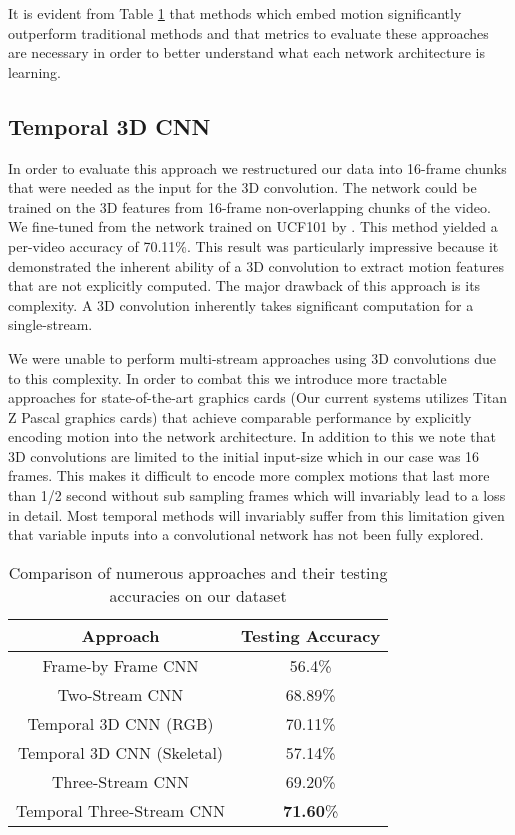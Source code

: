 \documentclass[10pt,twocolumn,letterpaper]{article}
\begin{document}
It is evident from Table \ref{tab:results} that methods which embed motion significantly outperform traditional methods and that metrics to evaluate these approaches are necessary in order to better understand what each network architecture is learning.

\subsection{Temporal 3D CNN}
In order to evaluate this approach we restructured our data into 16-frame chunks that were needed as the input for the 3D convolution. The network could be trained on the 3D features from 16-frame non-overlapping chunks of the video. We fine-tuned from the network trained on UCF101 by \cite{tran2014learning}. This method yielded a per-video accuracy of 70.11\%. This result was particularly impressive because it demonstrated the inherent ability of a 3D convolution to extract motion features that are not explicitly computed. The major drawback of this approach is its complexity. A 3D convolution inherently takes significant computation for a single-stream.

We were unable to perform multi-stream approaches using 3D convolutions due to this complexity. In order to combat this we introduce more tractable approaches for state-of-the-art graphics cards (Our current systems utilizes Titan Z Pascal graphics cards) that achieve comparable performance by explicitly encoding motion into the network architecture. In addition to this we note that 3D convolutions are limited to the initial input-size which in our case was 16 frames. This makes it difficult to encode more complex motions that last more than 1/2 second without sub sampling frames which will invariably lead to a loss in detail. Most temporal methods will invariably suffer from this limitation given that variable inputs into a convolutional network has not been fully explored.

\begin{table}[t]
\begin{center}
\begin{tabular}{|c|c|}
\hline
\textbf{Approach} & \textbf{Testing Accuracy}\\ \hline
Frame-by Frame CNN & 56.4\% \\ \hline
Two-Stream CNN & 68.89\% \\ \hline
Temporal 3D CNN (RGB) & 70.11\% \\ \hline
Temporal 3D CNN (Skeletal) & 57.14\% \\ \hline
Three-Stream CNN & 69.20\% \\ \hline
Temporal Three-Stream CNN & \textbf{71.60}\% \\
\hline
\end{tabular}
\vspace{0.5em}
\caption{Comparison of numerous approaches and their testing accuracies on our dataset
\label{tab:results}}
\end{center}
\end{table}
\end{document}
